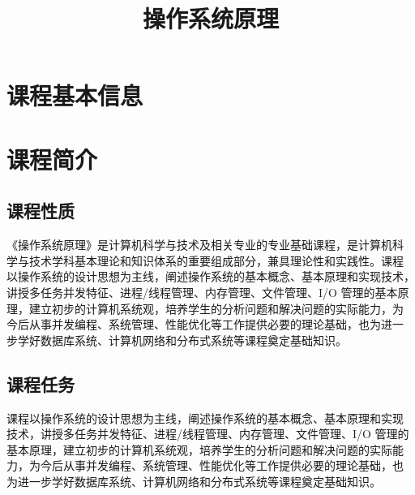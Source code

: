\documentclass{swfusyllabus}
\title{操作系统原理}
\begin{document}
\maketitle{}

\section{课程基本信息}

\basicinfo{}

\section{课程简介}

\subsection{课程性质}

《操作系统原理》是计算机科学与技术及相关专业的专业基础课程，是计算机科
学与技术学科基本理论和知识体系的重要组成部分，兼具理论性和实践性。课程
以操作系统的设计思想为主线，阐述操作系统的基本概念、基本原理和实现技术，
讲授多任务并发特征、进程/线程管理、内存管理、文件管理、I/O 管理的基本原
理，建立初步的计算机系统观，培养学生的分析问题和解决问题的实际能力，为
今后从事并发编程、系统管理、性能优化等工作提供必要的理论基础，也为进一
步学好数据库系统、计算机网络和分布式系统等课程奠定基础知识。

\subsection{课程任务}




课程以操作系统的设计思想为主线，阐述操作系统的基本概念、基本原理和实现
技术，讲授多任务并发特征、进程/线程管理、内存管理、文件管理、I/O 管理的
基本原理，建立初步的计算机系统观，培养学生的分析问题和解决问题的实际能
力，为今后从事并发编程、系统管理、性能优化等工作提供必要的理论基础，也
为进一步学好数据库系统、计算机网络和分布式系统等课程奠定基础知识。
\end{document}
